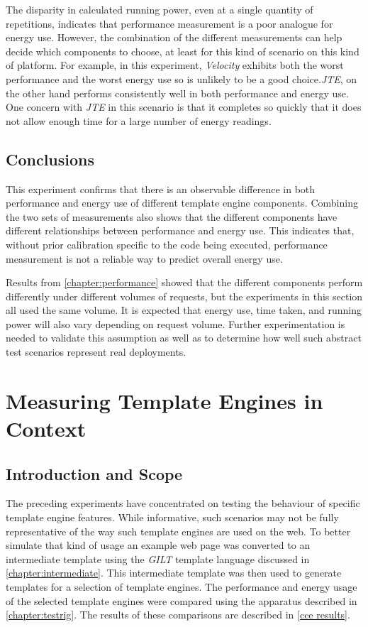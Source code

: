The disparity in calculated running power, even at a single quantity of repetitions, indicates that performance measurement is a poor analogue for energy use. However, the combination of the different measurements can help decide which components to choose, at least for this kind of scenario on this kind of platform. For example, in this experiment, \emph{Velocity} exhibits both the worst performance and the worst energy use so is unlikely to be a good choice.\emph{JTE}, on the other hand performs consistently well in both performance and energy use. One concern with \emph{JTE} in this scenario is that it completes so quickly that it does not allow enough time for a large number of energy readings.

\subsection{Conclusions}
\label{fse2 conclusions}

This experiment confirms that there is an observable difference in both performance and energy use of different \gls{template engine} components. Combining the two sets of measurements also shows that the different components have different relationships between performance and energy use. This indicates that, without prior calibration specific to the code being executed, performance measurement is not a reliable way to predict overall energy use.

Results from \autoref{chapter:performance} showed that the different components perform differently under different volumes of requests, but the experiments in this section all used the same volume. It is expected that energy use, time taken, and running power will also vary depending on request volume.  Further experimentation is needed to validate this assumption as well as to determine how well such abstract test scenarios represent real deployments.

\section{Measuring Template Engines in Context}
\label{section:context energy}

\subsection{Introduction and Scope}
\label{cce intro}

The preceding experiments have concentrated on testing the behaviour of specific \gls{template engine} features. While informative, such scenarios may not be fully representative of the way such \gls{template engine}s are used on the web. To better simulate that kind of usage an example web page was converted to an intermediate template using the \emph{GILT} \gls{template language} discussed in \autoref{chapter:intermediate}. This intermediate template was then used to generate templates for a selection of \gls{template engine}s. The performance and energy usage of the selected \gls{template engine}s were compared using the apparatus described in \autoref{chapter:testrig}. The results of these comparisons are described in \autoref{cce results}.

